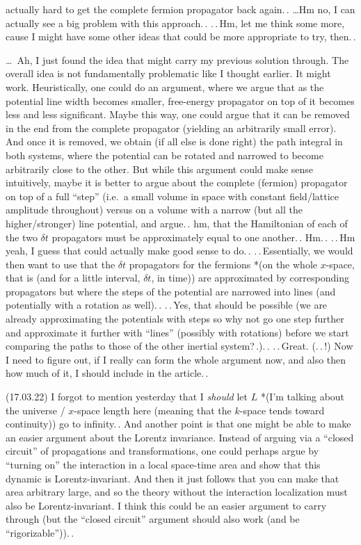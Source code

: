 \documentclass{report}
\begin{document}
actually hard to get the complete fermion propagator back again.\,. \ldots Hm no, I can actually see a big problem with this approach.\,. .\,.\,Hm, let me think some more, cause I might have some other ideas that could be more appropriate to try, then.\,. %

\ldots\ Ah, I just found the idea that might carry my previous solution through. The overall idea is not fundamentally problematic like I thought earlier. It might work. Heuristically, one could do an argument, where we argue that as the potential line width becomes smaller, free-energy propagator on top of it becomes less and less significant. Maybe this way, one could argue that it can be removed in the end from the complete propagator (yielding an arbitrarily small error). And once it is removed, we obtain (if all else is done right) the path integral in both systems, where the potential can be rotated and narrowed to become arbitrarily close to the other. But while this argument could make sense intuitively, maybe it is better to argue about the complete (fermion) propagator on top of a full ``step'' (i.e.\ a small volume in space with constant field/lattice amplitude throughout) versus on a volume with a narrow (but all the higher/stronger) line potential, and argue.\,. hm, that the Hamiltonian of each of the two $\delta t$ propagators must be approximately equal to one another.\,. Hm.\,. .\,.\,Hm yeah, I guess that could actually make good sense to do.\,. .\,.\,Essentially, we would then want to use that the $\delta t$ propagators for the fermions *(on the whole $x$-space, that is (and for a little interval, $\delta t$, in time)) are approximated by corresponding propagators but where the steps of the potential are narrowed into lines (and potentially with a rotation as well).\,. .\,.\,Yes, that should be possible (we are already approximating the potentials with steps so why not go one step further and approximate it further with ``lines'' (possibly with rotations) before we start comparing the paths to those of the other inertial system?\,.).\,. .\,.\,Great. (.\,.\,!) Now I need to figure out, if I really can form the whole argument now, and also then how much of it, I should include in the article.\,.  %

(17.03.22) I forgot to mention yesterday that I \emph{should} let $L$ *(I'm talking about the universe / $x$-space length here (meaning that the $k$-space tends toward continuity)) go to infinity.\,. And another point is that one might be able to make an easier argument about the Lorentz invariance. Instead of arguing via a ``closed circuit'' of propagations and transformations, one could perhaps argue by ``turning on'' the interaction in a local space-time area and show that this dynamic is Lorentz-invariant. And then it just follows that you can make that area arbitrary large, and so the theory without the interaction localization must also be Lorentz-invariant. I think this could be an easier argument to carry through (but the ``closed circuit'' argument should also work (and be ``rigorizable'')).\,. 
\end{document}
